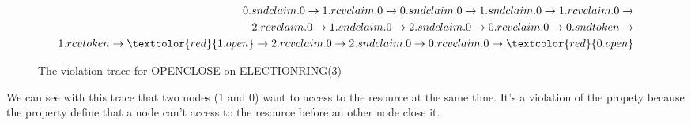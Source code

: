 \begin{figure}[!h]
\begin{equation*}
\begin{split}
	0.sndclaim.0 \rightarrow 1.rcvclaim.0 \rightarrow 0.sndclaim.0 \rightarrow 1.sndclaim.0 \rightarrow 1.rcvclaim.0 \rightarrow \\ 2.rcvclaim.0 \rightarrow 1.sndclaim.0 \rightarrow 2.sndclaim.0 \rightarrow 0.rcvclaim.0 \rightarrow 0.sndtoken \rightarrow \\
    1.rcvtoken \rightarrow \textcolor{red}{1.open} \rightarrow 2.rcvclaim.0 \rightarrow 2.sndclaim.0 \rightarrow 0.rcvclaim.0 \rightarrow \textcolor{red}{0.open}
\end{split}
\end{equation*}
\caption{The violation trace for OPENCLOSE on ELECTIONRING(3)}
\end{figure}

We can see with this trace that two nodes (1 and 0) want to access to the resource at the same time. It's a violation of the propety because the property define that a node can't access to the resource before an other node close it.
